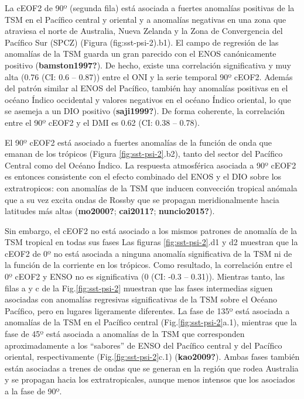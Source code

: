 \documentclass[12pt,oneside]{reedthesis}
\begin{document}
La cEOF2 de 90º (segunda fila) está asociada a fuertes anomalías positivas de la TSM en el Pacífico central y oriental y a anomalías negativas en una zona que atraviesa el norte de Australia, Nueva Zelanda y la Zona de Convergencia del Pacífico Sur (SPCZ) (Figura (fig:sst-psi-2).b1).
El campo de regresión de las anomalías de la TSM guarda un gran parecido con el ENOS canónicamente positivo (\textbf{bamston1997?}).
De hecho, existe una correlación significativa y muy alta (0.76 (CI: 0.6 -- 0.87)) entre el ONI y la serie temporal 90º cEOF2.
Además del patrón similar al ENOS del Pacífico, también hay anomalías positivas en el océano Índico occidental y valores negativos en el océano Índico oriental, lo que se asemeja a un DIO positivo (\textbf{saji1999?}).
De forma coherente, la correlación entre el 90º cEOF2 y el DMI es 0.62 (CI: 0.38 -- 0.78).

El 90º cEOF2 está asociado a fuertes anomalías de la función de onda que emanan de los trópicos (Figura \ref{fig:sst-psi-2}.b2), tanto del sector del Pacífico Central como del Océano Índico.
La respuesta atmosférica asociada a 90º cEOF2 es entonces consistente con el efecto combinado del ENOS y el DIO sobre los extratropicos: con anomalías de la TSM que inducen convección tropical anómala que a su vez excita ondas de Rossby que se propagan meridionalmente hacia latitudes más altas (\textbf{mo2000?}; \textbf{cai2011?}; \textbf{nuncio2015?}).

Sin embargo, el cEOF2 no está asociado a los mismos patrones de anomalía de la TSM tropical en todas sus fases Las figuras \ref{fig:sst-psi-2}.d1 y d2 muestran que la cEOF2 de 0º no está asociada a ninguna anomalía significativa de la TSM ni de la función de la corriente en los trópicos.
Como resultado, la correlación entre el 0º cEOF2 y ENSO no es significativa (0 (CI: -0.3 -- 0.31)).
Mientras tanto, las filas a y c de la Fig.\ref{fig:sst-psi-2} muestran que las fases intermedias siguen asociadas con anomalías regresivas significativas de la TSM sobre el Océano Pacífico, pero en lugares ligeramente diferentes.
La fase de 135º está asociada a anomalías de la TSM en el Pacífico central (Fig.\ref{fig:sst-psi-2}a.1), mientras que la fase de 45º está asociada a anomalías de la TSM que corresponden aproximadamente a los ``sabores'' de ENSO del Pacífico central y del Pacífico oriental, respectivamente (Fig.\ref{fig:sst-psi-2}c.1) (\textbf{kao2009?}).
Ambas fases también están asociadas a trenes de ondas que se generan en la región que rodea Australia y se propagan hacia los extratropicales, aunque menos intensos que los asociados a la fase de 90º.
\end{document}
